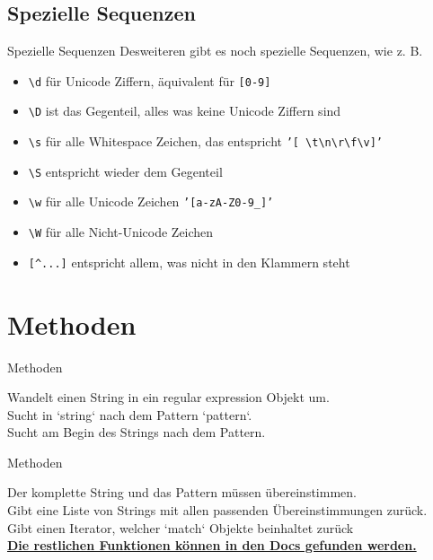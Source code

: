 \subsection{Spezielle Sequenzen}
\begin{frame}{Spezielle Sequenzen}
	Desweiteren gibt es noch spezielle Sequenzen, wie z. B.\\[.25cm]
	\begin{itemize}
		\item \texttt{\textbackslash{}d} für Unicode Ziffern, äquivalent für \texttt{[0-9]}
		\item \texttt{\textbackslash{}D} ist das Gegenteil, alles was keine Unicode Ziffern sind
		\item \texttt{\textbackslash{}s} für alle Whitespace Zeichen, das entspricht \texttt{'[\ \textbackslash{}t\textbackslash{}n\textbackslash{}r\textbackslash{}f\textbackslash{}v]'}
		\item \texttt{\textbackslash{}S} entspricht wieder dem Gegenteil
		\item \texttt{\textbackslash{}w} für alle Unicode Zeichen \texttt{'[a-zA-Z0-9\_]'}
		\item \texttt{\textbackslash{}W} für alle Nicht-Unicode Zeichen
		\item \texttt{[\^{}...]} entspricht allem, was nicht in den Klammern steht
	\end{itemize}
\end{frame}

\section{Methoden}
\begin{frame}[fragile]{Methoden}
	
	Wandelt einen String in ein regular expression Objekt um.\\[.25cm]
	
	Sucht in `string` nach dem Pattern `pattern`.\\[.25cm]
	
	Sucht am Begin des Strings nach dem Pattern.
\end{frame}

\begin{frame}[fragile]{Methoden}
	
	Der komplette String und das Pattern müssen übereinstimmen.\\[.25cm]
	
	Gibt eine Liste von Strings mit allen passenden Übereinstimmungen zurück.\\[.25cm]
	
	Gibt einen Iterator, welcher `match` Objekte beinhaltet zurück\\[.25cm]
	\textbf{\href{https://docs.python.org/3/library/re.html}{Die restlichen Funktionen können in den Docs gefunden werden.}}
\end{frame}

